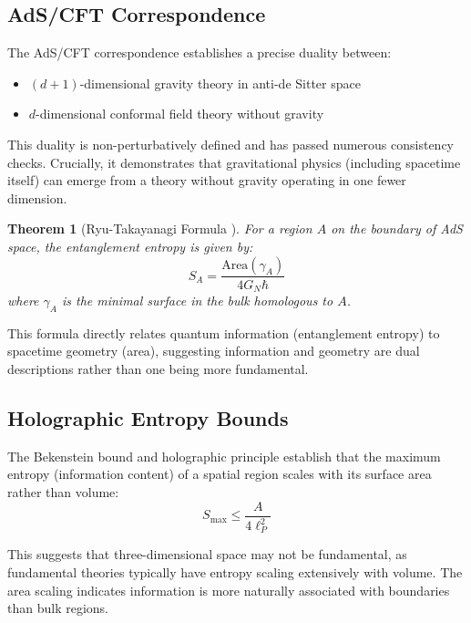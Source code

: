 \documentclass[12pt,twocolumn]{article}
\newtheorem{theorem}{Theorem}[section]
\theoremstyle{definition}
\theoremstyle{remark}
\begin{document}
\subsection{AdS/CFT Correspondence}

The AdS/CFT correspondence \cite{Maldacena1998} establishes a precise duality between:
\begin{itemize}
\item $(d+1)$-dimensional gravity theory in anti-de Sitter space
\item $d$-dimensional conformal field theory without gravity
\end{itemize}

This duality is non-perturbatively defined and has passed numerous consistency checks. Crucially, it demonstrates that gravitational physics (including spacetime itself) can emerge from a theory without gravity operating in one fewer dimension.

\begin{theorem}[Ryu-Takayanagi Formula \cite{Ryu2006}]
For a region $A$ on the boundary of AdS space, the entanglement entropy is given by:
\begin{equation}
S_A = \frac{\text{Area}(\gamma_A)}{4G_N\hbar}
\end{equation}
where $\gamma_A$ is the minimal surface in the bulk homologous to $A$.
\end{theorem}

This formula directly relates quantum information (entanglement entropy) to spacetime geometry (area), suggesting information and geometry are dual descriptions rather than one being more fundamental.

\subsection{Holographic Entropy Bounds}

The Bekenstein bound \cite{Bekenstein1981} and holographic principle \cite{tHooft1993,Susskind1995} establish that the maximum entropy (information content) of a spatial region scales with its surface area rather than volume:
\begin{equation}
S_{\max} \leq \frac{A}{4\ell_P^2}
\end{equation}

This suggests that three-dimensional space may not be fundamental, as fundamental theories typically have entropy scaling extensively with volume. The area scaling indicates information is more naturally associated with boundaries than bulk regions.
\end{document}
